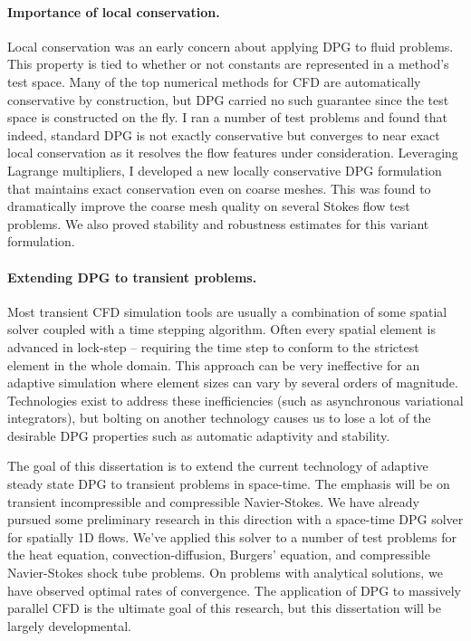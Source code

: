 \documentclass[letterpaper]{article}
\begin{document}
\paragraph{Importance of local conservation.}
Local conservation was an early concern about applying DPG to fluid problems. 
This property is tied to whether or not constants are represented in a method's test space.
Many of the top numerical methods for CFD are automatically conservative by construction, 
but DPG carried no such guarantee since the test space is constructed on the fly.
I ran a number of test problems and found that indeed, standard DPG is not exactly conservative but converges to near exact local conservation 
as it resolves the flow features under consideration.
Leveraging Lagrange multipliers, I developed a new locally conservative DPG formulation\cite{Ellis2013Report} 
that maintains exact conservation even on coarse meshes.
This was found to dramatically improve the coarse mesh quality on several Stokes flow test problems.
We also proved stability and robustness estimates for this variant formulation.

\paragraph{Extending DPG to transient problems.}
Most transient CFD simulation tools are usually a combination of some spatial solver coupled with a time stepping algorithm.
Often every spatial element is advanced in lock-step -- requiring the time step to conform to the strictest element in the whole domain.
This approach can be very ineffective for an adaptive simulation where element sizes can vary by several orders of magnitude.
Technologies exist to address these inefficiencies (such as asynchronous variational integrators\cite{Lew2003}), but bolting on another technology
causes us to lose a lot of the desirable DPG properties such as automatic adaptivity and stability.

The goal of this dissertation is to extend the current technology of adaptive steady state DPG to transient problems in space-time.
The emphasis will be on transient incompressible and compressible Navier-Stokes.
We have already pursued some preliminary research in this direction with a space-time DPG solver for spatially 1D flows.
We've applied this solver to a number of test problems for the heat equation, convection-diffusion, Burgers' equation, 
and compressible Navier-Stokes shock tube problems.
On problems with analytical solutions, we have observed optimal rates of convergence.
The application of DPG to massively parallel CFD is the ultimate goal of this research, but this dissertation will be largely developmental.
\end{document}
